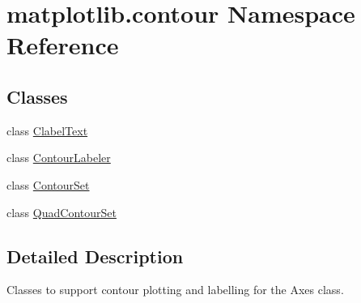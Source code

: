 \hypertarget{namespacematplotlib_1_1contour}{}\section{matplotlib.\+contour Namespace Reference}
\label{namespacematplotlib_1_1contour}
\subsection*{Classes}
\begin{DoxyCompactItemize}
\item 
class \hyperlink{classmatplotlib_1_1contour_1_1ClabelText}{Clabel\+Text}
\item 
class \hyperlink{classmatplotlib_1_1contour_1_1ContourLabeler}{Contour\+Labeler}
\item 
class \hyperlink{classmatplotlib_1_1contour_1_1ContourSet}{Contour\+Set}
\item 
class \hyperlink{classmatplotlib_1_1contour_1_1QuadContourSet}{Quad\+Contour\+Set}
\end{DoxyCompactItemize}


\subsection{Detailed Description}
\begin{DoxyVerb}Classes to support contour plotting and labelling for the Axes class.
\end{DoxyVerb}
 